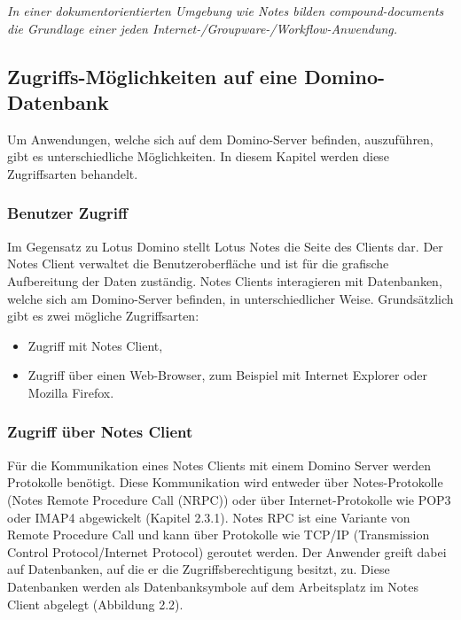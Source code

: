 \vspace{0.5cm}

\begin{graybox}
\textit{In einer dokumentorientierten Umgebung wie Notes bilden compound-documents die Grundlage einer jeden Internet-/Groupware-/Workflow-Anwendung\cite{knaepper}.}
\end{graybox}

\subsection{Zugriffs-Möglichkeiten auf eine Domino-Datenbank}



Um Anwendungen, welche sich auf dem Domino-Server befinden, auszuführen, gibt es unterschiedliche Möglichkeiten.
In diesem Kapitel werden diese Zugriffsarten behandelt.\newline



\subsubsection{Benutzer Zugriff}
\label{sec:5webzugriff}


Im Gegensatz zu Lotus Domino stellt Lotus Notes die Seite des Clients dar. Der Notes Client verwaltet die Benutzeroberfläche und ist für die 
grafische Aufbereitung der Daten zuständig.\newline
Notes Clients interagieren mit Datenbanken, welche sich am Domino-Server befinden, in unterschiedlicher Weise.
Grundsätzlich gibt es zwei mögliche Zugriffsarten:
\begin{itemize}
\item Zugriff mit Notes Client, 
\item Zugriff über einen Web-Browser, zum Beispiel mit Internet Explorer oder Mozilla Firefox. 
\end{itemize}



\subsubsection{Zugriff über Notes Client}
\label{sec:5webzugriff}

Für die Kommunikation eines Notes Clients mit einem Domino Server werden Protokolle benötigt. Diese Kommunikation wird entweder über Notes-Protokolle
(Notes Remote Procedure Call (NRPC)) oder über Internet-Protokolle wie POP3 oder IMAP4 abgewickelt (Kapitel 2.3.1). \linebreak Notes RPC ist eine 
Variante von Remote Procedure Call und kann über Protokolle wie TCP/IP (Transmission Control Protocol/Internet Protocol) geroutet werden.
Der Anwender greift dabei auf Datenbanken, auf die er die Zugriffsberechtigung besitzt, zu. 
Diese Datenbanken werden als Datenbanksymbole auf dem Arbeitsplatz im Notes Client abgelegt (Abbildung 2.2)\cite{ebel}.

